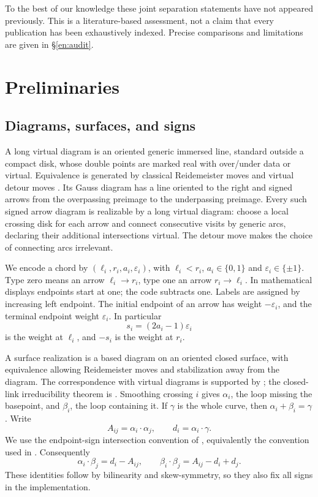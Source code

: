 \documentclass[12pt]{amsart}
\theoremstyle{definition}
\theoremstyle{remark}
\numberwithin{equation}{section}
\newcommand{\eps}{\varepsilon}
\begin{document}
To the best of our knowledge these joint separation statements have not
appeared previously. This is a literature-based assessment, not a claim
that every publication has been exhaustively indexed. Precise comparisons
and limitations are given in \S\ref{en:audit}.

\section{Preliminaries}
\subsection{Diagrams, surfaces, and signs}
A long virtual diagram is an oriented generic immersed line, standard
outside a compact disk, whose double points are marked real with
over/under data or virtual. Equivalence is generated by classical
Reidemeister moves and virtual detour moves \cite[\S\S2--3]{Kauffman}.
Its Gauss diagram has a line oriented to the right and signed arrows from
the overpassing preimage to the underpassing preimage. Every such signed
arrow diagram is realizable by a long virtual diagram: choose a local
crossing disk for each arrow and connect consecutive visits by generic
arcs, declaring their additional intersections virtual. The detour move
makes the choice of connecting arcs irrelevant.

We encode a chord by $(\ell_i,r_i,a_i,\eps_i)$, with $\ell_i<r_i$,
$a_i\in\{0,1\}$ and $\eps_i\in\{\pm1\}$. Type zero means an arrow
$\ell_i\to r_i$, type one an arrow $r_i\to\ell_i$.
In mathematical displays endpoints start at one; the code subtracts one.
Labels are assigned by increasing left endpoint.
The initial endpoint of an arrow has weight $-\eps_i$, and the terminal
endpoint weight $\eps_i$. In particular
\begin{equation}\label{en:s}
s_i=(2a_i-1)\eps_i
\end{equation}
is the weight at $\ell_i$, and $-s_i$ is the weight at $r_i$.

A surface realization is a based diagram on an oriented closed surface,
with equivalence allowing Reidemeister moves and stabilization away from
the diagram. The correspondence with virtual diagrams is supported by
\cite[Theorem 3.3 and Proposition 3.4]{CKS}; the closed-link irreducibility
theorem is \cite[Theorem 1]{Kuperberg}. Smoothing crossing $i$ gives
$\alpha_i$, the loop missing the basepoint, and $\beta_i$, the loop
containing it. If $\gamma$ is the whole curve, then
$\alpha_i+\beta_i=\gamma$. Write
\[
A_{ij}=\alpha_i\cdot\alpha_j,\qquad d_i=\alpha_i\cdot\gamma.
\]
We use the endpoint-sign intersection convention of
\cite[\S3, Lemmas 3.1--3.2]{HNNS}, equivalently the convention used in
\cite[\S3]{SW}. Consequently
\begin{equation}\label{en:bilinear}
\alpha_i\cdot\beta_j=d_i-A_{ij},\qquad
\beta_i\cdot\beta_j=A_{ij}-d_i+d_j.
\end{equation}
These identities follow by bilinearity and skew-symmetry, so they also fix
all signs in the implementation.
\end{document}
